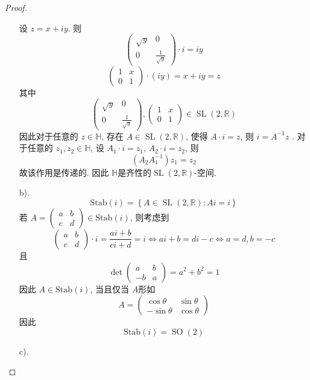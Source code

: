 \documentclass[../main.tex]{subfiles}
\begin{document}
\begin{proof}
\begin{enumerate}
    设 \(  z= x+ iy  \). 则 \[
   \begin{pmatrix} 
      \sqrt{y}&0\\ 
        0&\frac{1 }{\sqrt{y} }   
   \end{pmatrix} \cdot i=  iy
    \]  \[
    \begin{pmatrix} 
        1& x\\ 
         0& 1 
    \end{pmatrix} \cdot \left( iy \right)= x+ iy= z  
    \] 其中 \[
    \begin{pmatrix} 
        \sqrt{y}&0\\ 
         0&\frac{1 }{\sqrt{y} }  
    \end{pmatrix}, \begin{pmatrix} 
        1&x\\ 
         0&1 
    \end{pmatrix} \in \operatorname{SL}\left( 2,\mathbb{R}  \right)   
    \]因此对于任意的 \(  z \in \mathbb{H}  \), 存在 \(  A\in \operatorname{SL}\left( 2,\mathbb{R}  \right)   \), 使得 \(  A\cdot i= z  \), 则 \(  i= A^{-1} z  \)   . 对于任意的 \(  z_1,z_2\in \mathbb{H}  \), 设 \(  A_1\cdot i= z_1  \), \(  A_2\cdot i= z_2  \), 则 \[
    \left( A_2 A_1^{-1}  \right)z_1= z_2 
    \]   故该作用是传递的. 因此 \(  \mathbb{H}  \)是齐性的\(  \operatorname{SL}\left( 2,\mathbb{R}  \right)   \)-空间.  
    \item [b).] \[
    \mathrm{Stab}\left( i \right)= \left\{ A\in \operatorname{SL}\left( 2,\mathbb{R}  \right): Ai= i  \right\} 
    \]若 \(  A= \begin{pmatrix} 
        a&b\\ 
         c&d 
    \end{pmatrix}\in \mathrm{Stab}\left( i \right)    \), 则考虑到  \[
    \begin{pmatrix} 
        a&b\\ 
         c&d 
    \end{pmatrix}\cdot i= \frac{ai+ b }{ci+ d }  = i\iff  ai+ b= di-c\iff a= d, b= -c
    \] 且 \[
    \det \begin{pmatrix} 
        a&b\\ 
         -b&a 
    \end{pmatrix}= a^{2}+ b^{2} = 1
    \]因此 \(  A\in \mathrm{Stab}\left( i \right)   \), 当且仅当 \(  A  \)形如 \[
    A= \begin{pmatrix} 
        \cos  \theta & \sin  \theta \\ 
         -\sin  \theta &\cos  \theta  
    \end{pmatrix} 
    \]  因此 \[
    \mathrm{Stab}\left( i \right)= \operatorname{SO}\left( 2 \right) 
    \]
    \item [c).] 
    

\end{enumerate}
\end{proof}
\end{document}
